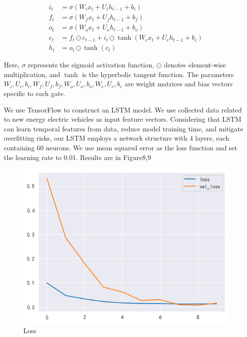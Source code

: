 \documentclass{apmcmthesis}
\begin{document}
\begin{equation}
    \begin{aligned}
        i_t & = \sigma(W_i x_t + U_i h_{t-1} + b_i) \\
        f_t & = \sigma(W_f x_t + U_f h_{t-1} + b_f) \\
        o_t & = \sigma(W_o x_t + U_o h_{t-1} + b_o) \\
        c_t & = f_t \odot c_{t-1} + i_t \odot \tanh(W_c x_t + U_c h_{t-1} + b_c) \\
        h_t & = o_t \odot \tanh(c_t)
    \end{aligned}
\end{equation}
    

Here, \(\sigma\) represents the sigmoid activation function, \(\odot\) denotes element-wise multiplication, and \(\tanh\) is the hyperbolic tangent function. The parameters \(W_i, U_i, b_i, W_f, U_f, b_f, W_o, U_o, b_o, W_c, U_c, b_c\) are weight matrices and bias vectors specific to each gate.

We use TensorFlow to construct an LSTM model. We use collected data related to new energy electric vehicles as input feature vectors. Considering that LSTM can learn temporal features from data, reduce model training time, and mitigate overfitting risks, our LSTM employs a network structure with 4 layers, each containing 60 neurons. We use mean squared error as the loss function and set the learning rate to 0.01.
Results are in Figure8,9
\begin{figure}[h]
    \centering
    \includegraphics[scale=0.5]{figures/Figure/loss.png}
    \caption{Loss}
\end{figure}
\end{document}
